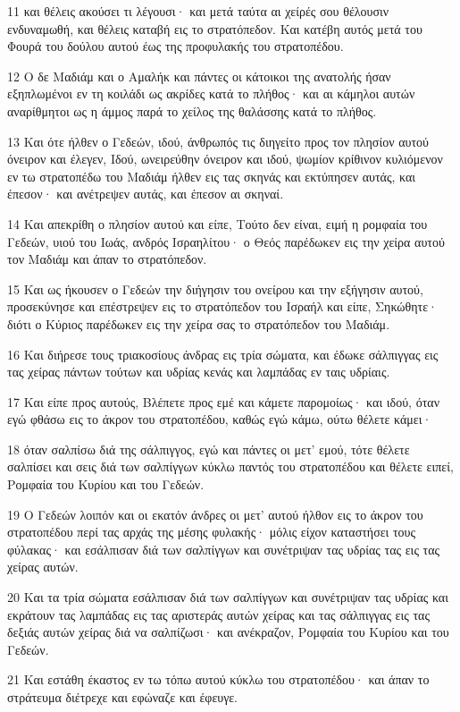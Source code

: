 \par 11 και θέλεις ακούσει τι λέγουσι· και μετά ταύτα αι χείρές σου θέλουσιν ενδυναμωθή, και θέλεις καταβή εις το στρατόπεδον. Και κατέβη αυτός μετά του Φουρά του δούλου αυτού έως της προφυλακής του στρατοπέδου.
\par 12 Ο δε Μαδιάμ και ο Αμαλήκ και πάντες οι κάτοικοι της ανατολής ήσαν εξηπλωμένοι εν τη κοιλάδι ως ακρίδες κατά το πλήθος· και αι κάμηλοι αυτών αναρίθμητοι ως η άμμος παρά το χείλος της θαλάσσης κατά το πλήθος.
\par 13 Και ότε ήλθεν ο Γεδεών, ιδού, άνθρωπός τις διηγείτο προς τον πλησίον αυτού όνειρον και έλεγεν, Ιδού, ωνειρεύθην όνειρον και ιδού, ψωμίον κρίθινον κυλιόμενον εν τω στρατοπέδω του Μαδιάμ ήλθεν εις τας σκηνάς και εκτύπησεν αυτάς, και έπεσον· και ανέτρεψεν αυτάς, και έπεσον αι σκηναί.
\par 14 Και απεκρίθη ο πλησίον αυτού και είπε, Τούτο δεν είναι, ειμή η ρομφαία του Γεδεών, υιού του Ιωάς, ανδρός Ισραηλίτου· ο Θεός παρέδωκεν εις την χείρα αυτού τον Μαδιάμ και άπαν το στρατόπεδον.
\par 15 Και ως ήκουσεν ο Γεδεών την διήγησιν του ονείρου και την εξήγησιν αυτού, προσεκύνησε και επέστρεψεν εις το στρατόπεδον του Ισραήλ και είπε, Σηκώθητε· διότι ο Κύριος παρέδωκεν εις την χείρα σας το στρατόπεδον του Μαδιάμ.
\par 16 Και διήρεσε τους τριακοσίους άνδρας εις τρία σώματα, και έδωκε σάλπιγγας εις τας χείρας πάντων τούτων και υδρίας κενάς και λαμπάδας εν ταις υδρίαις.
\par 17 Και είπε προς αυτούς, Βλέπετε προς εμέ και κάμετε παρομοίως· και ιδού, όταν εγώ φθάσω εις το άκρον του στρατοπέδου, καθώς εγώ κάμω, ούτω θέλετε κάμει·
\par 18 όταν σαλπίσω διά της σάλπιγγος, εγώ και πάντες οι μετ' εμού, τότε θέλετε σαλπίσει και σεις διά των σαλπίγγων κύκλω παντός του στρατοπέδου και θέλετε ειπεί, Ρομφαία του Κυρίου και του Γεδεών.
\par 19 Ο Γεδεών λοιπόν και οι εκατόν άνδρες οι μετ' αυτού ήλθον εις το άκρον του στρατοπέδου περί τας αρχάς της μέσης φυλακής· μόλις είχον καταστήσει τους φύλακας· και εσάλπισαν διά των σαλπίγγων και συνέτριψαν τας υδρίας τας εις τας χείρας αυτών.
\par 20 Και τα τρία σώματα εσάλπισαν διά των σαλπίγγων και συνέτριψαν τας υδρίας και εκράτουν τας λαμπάδας εις τας αριστεράς αυτών χείρας και τας σάλπιγγας εις τας δεξιάς αυτών χείρας διά να σαλπίζωσι· και ανέκραζον, Ρομφαία του Κυρίου και του Γεδεών.
\par 21 Και εστάθη έκαστος εν τω τόπω αυτού κύκλω του στρατοπέδου· και άπαν το στράτευμα διέτρεχε και εφώναζε και έφευγε.
